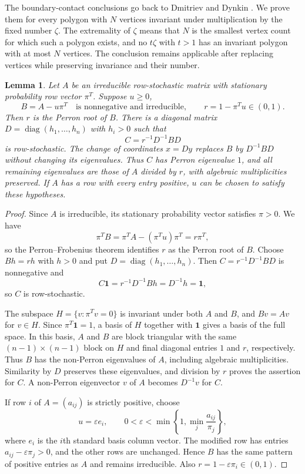 \documentclass[11pt,a4paper]{article}
\newtheorem{lemma}[theorem]{Lemma}
\theoremstyle{definition}
\theoremstyle{remark}
\numberwithin{equation}{section}
\begin{document}
The boundary-contact conclusions go back to Dmitriev and Dynkin \cite[\S\S1--2]{DD}. We prove them for every polygon with $N$ vertices invariant under multiplication by the fixed number $\zeta$. The extremality of $\zeta$ means that $N$ is the smallest vertex count for which such a polygon exists, and no $t\zeta$ with $t>1$ has an invariant polygon with at most $N$ vertices. The conclusion remains applicable after replacing vertices while preserving invariance and their number.

\begin{lemma}\label{lem:perron-deflation}
Let $A$ be an irreducible row-stochastic matrix with stationary probability row vector $\pi^T$. Suppose $u\ge0$,
\[
 B=A-u\pi^T\quad\text{is nonnegative and irreducible},
 \qquad r=1-\pi^Tu\in(0,1).
\]
Then $r$ is the Perron root of $B$. There is a diagonal matrix $D=\operatorname{diag}(h_1,\ldots,h_n)$ with $h_i>0$ such that
\[
 C=r^{-1}D^{-1}BD
\]
is row-stochastic. The change of coordinates $x=Dy$ replaces $B$ by $D^{-1}BD$ without changing its eigenvalues. Thus $C$ has Perron eigenvalue $1$, and all remaining eigenvalues are those of $A$ divided by $r$, with algebraic multiplicities preserved. If $A$ has a row with every entry positive, $u$ can be chosen to satisfy these hypotheses.
\end{lemma}
\begin{proof}
Since $A$ is irreducible, its stationary probability vector satisfies $\pi>0$. We have
\[
 \pi^TB=\pi^TA-(\pi^Tu)\pi^T=r\pi^T,
\]
so the Perron--Frobenius theorem identifies $r$ as the Perron root of $B$. Choose $Bh=rh$ with $h>0$ and put $D=\operatorname{diag}(h_1,\ldots,h_n)$. Then $C=r^{-1}D^{-1}BD$ is nonnegative and
\[
 C\mathbf1=r^{-1}D^{-1}Bh=D^{-1}h=\mathbf1,
\]
so $C$ is row-stochastic.

The subspace $H=\{v:\pi^Tv=0\}$ is invariant under both $A$ and $B$, and $Bv=Av$ for $v\in H$. Since $\pi^T\mathbf1=1$, a basis of $H$ together with $\mathbf1$ gives a basis of the full space. In this basis, $A$ and $B$ are block triangular with the same $(n-1)\times(n-1)$ block on $H$ and final diagonal entries $1$ and $r$, respectively. Thus $B$ has the non-Perron eigenvalues of $A$, including algebraic multiplicities. Similarity by $D$ preserves these eigenvalues, and division by $r$ proves the assertion for $C$. A non-Perron eigenvector $v$ of $A$ becomes $D^{-1}v$ for $C$.

If row $i$ of $A=(a_{ij})$ is strictly positive, choose
\[
 u=\varepsilon e_i,\qquad
 0<\varepsilon<\min\left\{1,\min_j\frac{a_{ij}}{\pi_j}\right\},
\]
where $e_i$ is the $i$th standard basis column vector. The modified row has entries $a_{ij}-\varepsilon\pi_j>0$, and the other rows are unchanged. Hence $B$ has the same pattern of positive entries as $A$ and remains irreducible. Also $r=1-\varepsilon\pi_i\in(0,1)$.
\end{proof}
\end{document}

